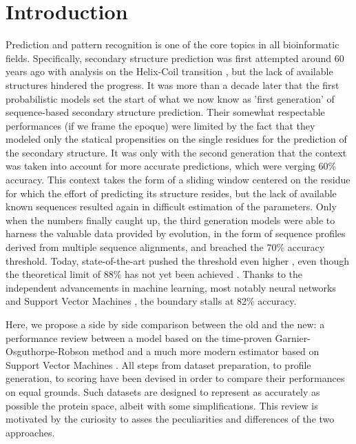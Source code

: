 \documentclass[nocrop]{bioinfo}
\begin{document}
\section{Introduction}
Prediction and pattern recognition is one of the core topics in all bioinformatic fields.
Specifically, secondary structure prediction was first attempted around 60 years ago with analysis on the Helix-Coil transition \citep{Zimm1959} \citep{Lifson1961}, but the lack of available structures hindered the progress.
It was more than a decade later that the first probabilistic models set the start of what we now know as 'first generation' of sequence-based secondary structure prediction.
Their somewhat respectable performances (if we frame the epoque) were limited by the fact that they modeled only the statical propensities on the single residues for the prediction of the secondary structure.
It was only with the second generation that the context \citep{Garnier1978} was taken into account for more accurate predictions, which were verging 60\% accuracy.
This context takes the form of a sliding window centered on the residue for which the effort of predicting its structure resides, but the lack of available known sequences resulted again in difficult estimation of the parameters.
Only when the numbers finally caught up, the third generation models were able to harness the valuable data provided by evolution, in the form of sequence profiles derived from multiple sequence alignments, and breached the 70\% accuracy threshold.
Today, state-of-the-art pushed the threshold even higher \citep{bibid}, even though the theoretical limit of 88\% has not yet been achieved \citep{Rost2001}\citep{Russell1993}.
Thanks to the independent advancements in machine learning, most notably neural networks \citep{Drozdetskiy2015}\citep{Heffernan2018} and Support Vector Machines \citep{Kieslich2016}, the boundary stalls at 82\% accuracy.

Here, we propose a side by side comparison between the old and the new: a performance review between a model based on the time-proven Garnier-Osguthorpe-Robson method \citep{Garnier1978} and a much more modern estimator based on Support Vector Machines \citep{Cortes1995}.
All steps from dataset preparation, to profile generation, to scoring have been devised in order to compare their performances on equal grounds. 
Such datasets are designed to represent as accurately as possible the protein space, albeit with some simplifications.
This review is motivated by the curiosity to asses the peculiarities and differences of the two approaches. 
\end{document}
